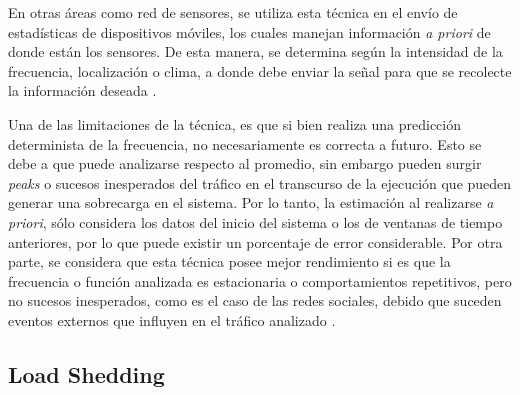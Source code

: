 En otras áreas como red de sensores, se utiliza esta técnica en el envío de estadísticas de dispositivos móviles, los cuales manejan información \textit{a priori} de donde están los sensores. De esta manera, se determina según la intensidad de la frecuencia, localización o clima, a donde debe enviar la señal para que se recolecte la información deseada \citep{DongTS07}.

Una de las limitaciones de la técnica, es que si bien realiza una predicción determinista de la frecuencia, no necesariamente es correcta a futuro. Esto se debe a que puede analizarse respecto al promedio, sin embargo pueden surgir \textit{peaks} o sucesos inesperados del tráfico en el transcurso de la ejecución que pueden generar una sobrecarga en el sistema. Por lo tanto, la estimación al realizarse \textit{a priori}, sólo considera los datos del inicio del sistema o los de ventanas de tiempo anteriores, por lo que puede existir un porcentaje de error considerable. Por otra parte, se considera que esta técnica posee mejor rendimiento si es que la frecuencia o función analizada es estacionaria o comportamientos repetitivos, pero no sucesos inesperados, como es el caso de las redes sociales, debido que suceden eventos externos que influyen en el tr\'afico analizado \citep{KarpSP03}.



\subsection{Load Shedding}
\label{sec:loadSheddingBC}

